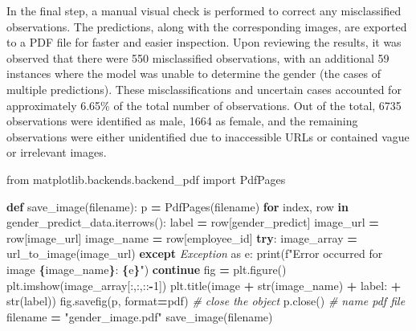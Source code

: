 \documentclass[11pt,]{article}
\newenvironment{Shaded}{\begin{snugshade}}{\end{snugshade}}
\newcommand{\BuiltInTok}[1]{#1}
\newcommand{\CommentTok}[1]{\textcolor[rgb]{0.56,0.35,0.01}{\textit{#1}}}
\newcommand{\ControlFlowTok}[1]{\textcolor[rgb]{0.13,0.29,0.53}{\textbf{#1}}}
\newcommand{\DecValTok}[1]{\textcolor[rgb]{0.00,0.00,0.81}{#1}}
\newcommand{\ImportTok}[1]{#1}
\newcommand{\KeywordTok}[1]{\textcolor[rgb]{0.13,0.29,0.53}{\textbf{#1}}}
\newcommand{\NormalTok}[1]{#1}
\newcommand{\OperatorTok}[1]{\textcolor[rgb]{0.81,0.36,0.00}{\textbf{#1}}}
\newcommand{\PreprocessorTok}[1]{\textcolor[rgb]{0.56,0.35,0.01}{\textit{#1}}}
\newcommand{\SpecialCharTok}[1]{\textcolor[rgb]{0.81,0.36,0.00}{\textbf{#1}}}
\newcommand{\SpecialStringTok}[1]{\textcolor[rgb]{0.31,0.60,0.02}{#1}}
\newcommand{\StringTok}[1]{\textcolor[rgb]{0.31,0.60,0.02}{#1}}
\begin{document}
In the final step, a manual visual check is performed to correct any
misclassified observations. The predictions, along with the
corresponding images, are exported to a PDF file for faster and easier
inspection. Upon reviewing the results, it was observed that there were
550 misclassified observations, with an additional 59 instances where
the model was unable to determine the gender (the cases of multiple
predictions). These misclassifications and uncertain cases accounted for
approximately 6.65\% of the total number of observations. Out of the
total, 6735 observations were identified as male, 1664 as female, and
the remaining observations were either unidentified due to inaccessible
URLs or contained vague or irrelevant images.

\begin{Shaded}
\begin{Highlighting}[]
\ImportTok{from}\NormalTok{ matplotlib.backends.backend\_pdf }\ImportTok{import}\NormalTok{ PdfPages}

\KeywordTok{def}\NormalTok{ save\_image(filename):}
\NormalTok{    p }\OperatorTok{=}\NormalTok{ PdfPages(filename)}
    \ControlFlowTok{for}\NormalTok{ index, row }\KeywordTok{in}\NormalTok{ gender\_predict\_data.iterrows():}
\NormalTok{        label }\OperatorTok{=}\NormalTok{ row[}\StringTok{\textquotesingle{}gender\_predict\textquotesingle{}}\NormalTok{]}
\NormalTok{        image\_url }\OperatorTok{=}\NormalTok{ row[}\StringTok{\textquotesingle{}image\_url\textquotesingle{}}\NormalTok{]}
\NormalTok{        image\_name }\OperatorTok{=}\NormalTok{ row[}\StringTok{\textquotesingle{}employee\_id\textquotesingle{}}\NormalTok{]}
        \ControlFlowTok{try}\NormalTok{:}
\NormalTok{            image\_array }\OperatorTok{=}\NormalTok{ url\_to\_image(image\_url)}
        \ControlFlowTok{except} \PreprocessorTok{Exception} \ImportTok{as}\NormalTok{ e:}
            \BuiltInTok{print}\NormalTok{(}\SpecialStringTok{f"Error occurred for image }\SpecialCharTok{\{}\NormalTok{image\_name}\SpecialCharTok{\}}\SpecialStringTok{: }\SpecialCharTok{\{}\NormalTok{e}\SpecialCharTok{\}}\SpecialStringTok{"}\NormalTok{)}
            \ControlFlowTok{continue}
\NormalTok{        fig }\OperatorTok{=}\NormalTok{ plt.figure()}
\NormalTok{        plt.imshow(image\_array[:,:,::}\OperatorTok{{-}}\DecValTok{1}\NormalTok{])}
\NormalTok{        plt.title(}\StringTok{\textquotesingle{}image \textquotesingle{}} \OperatorTok{+} \BuiltInTok{str}\NormalTok{(image\_name) }\OperatorTok{+} \StringTok{\textquotesingle{} label:\textquotesingle{}} \OperatorTok{+} \BuiltInTok{str}\NormalTok{(label))}
\NormalTok{        fig.savefig(p, }\BuiltInTok{format}\OperatorTok{=}\StringTok{\textquotesingle{}pdf\textquotesingle{}}\NormalTok{) }
    \CommentTok{\# close the object}
\NormalTok{    p.close()}
\CommentTok{\# name pdf file}
\NormalTok{filename }\OperatorTok{=} \StringTok{"gender\_image.pdf"}  
\NormalTok{save\_image(filename)  }
\end{Highlighting}
\end{Shaded}
\end{document}
